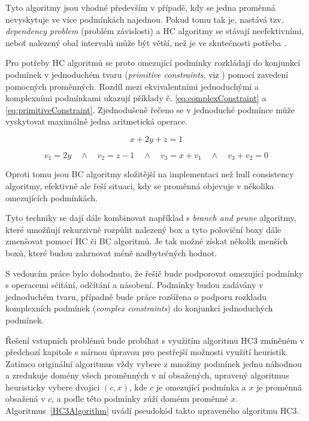 Tyto algoritmy jsou vhodné především v případě, kdy se jedna proměnná nevyskytuje ve více podmínkách najednou. Pokud tomu tak je, nastává tzv. \emph{dependency problem} (problém závislosti) a HC algoritmy se stávají neefektivními, neboť nalezený obal intervalů může být větší, než je ve skutečnosti potřeba \cite{BenhamouCLPIntervals}.

Pro potřeby HC algoritmů se proto omezující podmínky rozkládají do konjunkcí podmínek v jednoduchém tvaru (\emph{primitive constraints}, viz \cite{kue12}) pomocí zavedení pomocných proměnných. Rozdíl mezi ekvivalentními jednoduchými a komplexními podmínkami ukazují příklady č. \ref{eq:complexConstraint} a \ref{eq:primitiveConstraint}. Zjednodušeně řečeno se v jednoduché podmínce může vyskytovat maximálně jedna aritmetická operace.

\begin{equation} \label{eq:complexConstraint}
x + 2y + z = 1
\end{equation}

\begin{equation} \label{eq:primitiveConstraint}
v_1 = 2y \quad \wedge \quad v_2 = z - 1 \quad \wedge \quad v_3 = x + v_1 \quad \wedge \quad v_3 + v_2 = 0
\end{equation}

Oproti tomu jsou BC algoritmy složitější na implementaci než hull consistency algoritmy, efektivně ale řeší situaci, kdy se proměnná objevuje v několika omezujících podmínkách.

Tyto techniky se dají dále kombinovat například s \emph{branch and prune} algoritmy, které umožňují rekurzivně rozpůlit nalezený box a tyto poloviční boxy dále zmenšovat pomocí HC či BC algoritmů. Je tak možné získat několik menších boxů, které budou zahrnovat méně nadbytečných hodnot.

S vedoucím práce bylo dohodnuto, že řešič bude podporovat omezující podmínky s operacemi sčítání, odčítání a násobení. Podmínky budou zadávány v jednoduchém tvaru, případně bude práce rozšířena o podporu rozkladu komplexních podmínek (\emph{complex constraints}) do konjunkcí jednoduchých podmínek. 

Řešení vstupních problémů bude probíhat s využitím algoritmu HC3 zmíněném v předchozí kapitole s mírnou úpravou pro pestřejší možnosti využití heuristik. Zatímco originální algoritmus vždy vybere z množiny podmínek jednu náhodnou a zredukuje domény všech proměnných v ní obsažených, upravený algoritmus heuristicky vybere dvojici $(c, x)$, kde $c$ je omezující podmínka a $x$ je proměnná obsažená v $c$, a podle této podmínky zúží doménu proměnné $x$. Algoritmus~\ref{HC3Algorithm} uvádí pseudokód takto upraveného algoritmu HC3.

